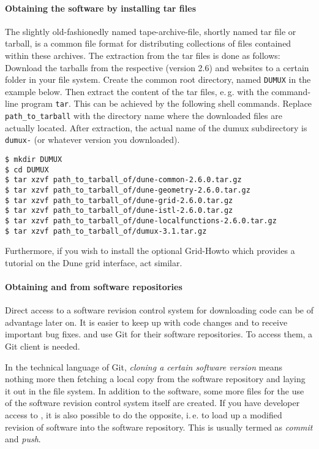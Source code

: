 \paragraph{Obtaining the software by installing tar files}
The slightly old-fashionedly named tape-archive-file, shortly named tar file or
tarball, is a common file format for distributing collections of files contained
within these archives.
The extraction from the tar files is done as follows:
Download the tarballs from the respective \Dune (version 2.6) and \Dumux websites
to a certain folder in your file system.
Create the common root directory, named \texttt{DUMUX} in the example below.
Then extract the content of the tar files, e.\,g. with the command-line program
\texttt{tar}.
This can be achieved by the following shell commands. Replace \texttt{path\_to\_tarball}
with the directory name where the downloaded files are actually located.
After extraction, the actual name of the dumux subdirectory is \texttt{dumux-\DumuxVersion}
(or whatever version you downloaded).

\begin{lstlisting}[style=Bash]
$ mkdir DUMUX
$ cd DUMUX
$ tar xzvf path_to_tarball_of/dune-common-2.6.0.tar.gz
$ tar xzvf path_to_tarball_of/dune-geometry-2.6.0.tar.gz
$ tar xzvf path_to_tarball_of/dune-grid-2.6.0.tar.gz
$ tar xzvf path_to_tarball_of/dune-istl-2.6.0.tar.gz
$ tar xzvf path_to_tarball_of/dune-localfunctions-2.6.0.tar.gz
$ tar xzvf path_to_tarball_of/dumux-3.1.tar.gz
\end{lstlisting}

Furthermore, if you wish to install the optional \Dune Grid-Howto which provides a tutorial
on the Dune grid interface, act similar.

\paragraph{Obtaining \Dune and \Dumux from software repositories}
Direct access to a software revision control system for downloading code can be of advantage later on.
It is easier to keep up with code changes and to receive important bug fixes.
\Dune and \Dumux use Git for their software repositories. To access them, a Git client is needed.

In the technical language of Git, \emph{cloning a certain software version} means nothing more then fetching
a local copy from the software repository and laying it out in the file system.
In addition to the software, some more files for the use of the software revision
control system itself are created. If you have developer access to \Dumux, it is
also possible to do the opposite, i.\,e. to load up a modified revision of software
into the software repository. This is usually termed as \emph{commit} and \emph{push}.

